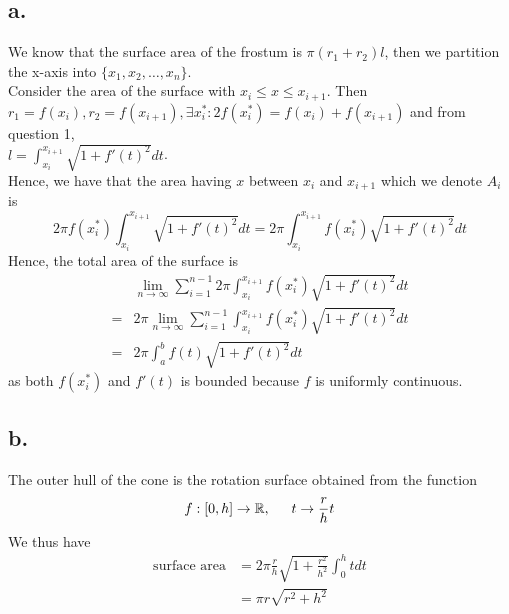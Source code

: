 \documentclass[11pt]{article}
\begin{document}
\subsection*{a.}
We know that the surface area of the frostum is $\pi (r_1 + r_2) l$, then we partition the x-axis into 
$\{x_1, x_2, \ldots, x_n\}$. \\
Consider the area of the surface with $x_i \le x \le x_{i+1}$. 
Then $r_1 = f(x_i), r_2 = f(x_{i+1}), \exists x_i^*: 2f(x_i^*) = f(x_i) + f(x_{i+1})$ and from question 1, \\
$l = \int_{x_i}^{x_{i+1}} \sqrt{1+f'(t)^2} dt$.\\
Hence, we have that the area having $x$ between $x_i$ and $x_{i+1}$ which we denote $A_i$ is 
\[
    2\pi f(x_i^*) \int_{x_i}^{x_{i+1}} \sqrt{1+f'(t)^2} dt = 2\pi \int_{x_i}^{x_{i+1}} f(x_i^*) \sqrt{1+f'(t)^2} dt 
\]
Hence, the total area of the surface is 
\begin{equation*}
    \begin{aligned}
        &\lim_{n\to \infty} \sum_{i=1}^{n-1} 2\pi \int_{x_i}^{x_{i+1}} f(x_i^*)  \sqrt{1+f'(t)^2} dt \\
        =& 2\pi \lim_{n\to \infty} \sum_{i=1}^{n-1} \int_{x_i}^{x_{i+1}} f(x_i^*)  \sqrt{1+f'(t)^2} dt \\
        =& 2\pi \int_a^b f(t) \sqrt{1+f'(t)^2} dt
    \end{aligned}
\end{equation*}
as both $f(x_i^*)$ and $f'(t)$ is bounded because $f$ is uniformly continuous.
\subsection*{b.}
The outer hull of the cone is the rotation surface obtained from the function 
\[
    f: [0,h] \to \mathbb{R}, \indent t \to \frac{r}{h}t    
\]
We thus have
\begin{equation*}
    \begin{aligned}
        \text{surface area} &= 2\pi\frac{r}{h}\sqrt{1+\frac{r^2}{h^2}}\int_0^h t dt \\
        &= \pi r \sqrt{r^2 + h^2}
    \end{aligned}
\end{equation*}
\end{document}
